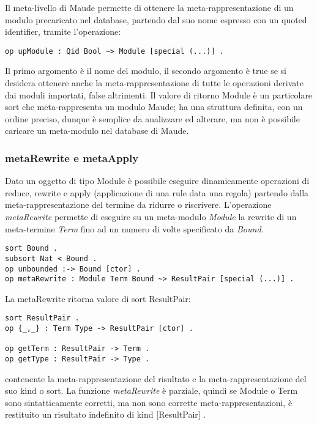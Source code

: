 Il meta-livello di Maude permette di ottenere la meta-rappresentazione di un
modulo precaricato nel database, partendo dal suo nome espresso con un quoted
identifier, tramite l'operazione:
\begin{Verbatim}[fontsize=\small]
op upModule : Qid Bool ~> Module [special (...)] .
\end{Verbatim}
Il primo argomento è il nome del modulo, il secondo argomento è true se si
desidera ottenere anche la meta-rappresentazione di tutte le operazioni
derivate dai moduli importati, false altrimenti. Il valore di ritorno Module è
un particolare sort che meta-rappresenta un modulo Maude; ha una struttura
definita, con un ordine preciso, dunque è semplice da analizzare ed alterare, ma
non è possibile caricare un meta-modulo nel database di Maude.

\subsubsection{metaRewrite e metaApply}
\label{sec:mapply}
Dato un oggetto di tipo Module è possibile eseguire dinamicamente operazioni
di reduce, rewrite e apply (applicazione di una rule data una regola) partendo
dalla meta-rappresentazione del termine da ridurre o riscrivere. L'operazione
\emph{metaRewrite} permette di eseguire su un meta-modulo \emph{Module} la
rewrite di un meta-termine \emph{Term} fino ad un numero di volte specificato da
\emph{Bound}.
\begin{Verbatim}[fontsize=\small]
sort Bound .
subsort Nat < Bound .
op unbounded :-> Bound [ctor] .
op metaRewrite : Module Term Bound ~> ResultPair [special (...)] .
\end{Verbatim}
La metaRewrite ritorna valore di sort ResultPair:
\begin{Verbatim}[fontsize=\small]
sort ResultPair .
op {_,_} : Term Type -> ResultPair [ctor] .

op getTerm : ResultPair -> Term .
op getType : ResultPair -> Type .
\end{Verbatim}
contenente la meta-rappresentazione del risultato e la meta-rappresentazione del
suo kind o sort. La funzione \emph{metaRewrite} è parziale, quindi se Module o
Term sono sintatticamente corretti, ma non sono corrette meta-rappresentazioni,
è restituito un risultato indefinito di kind [ResultPair] .

